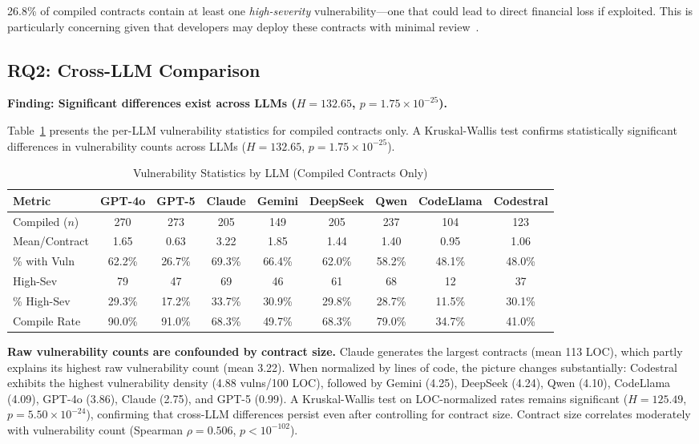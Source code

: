 26.8\% of compiled contracts contain at least one \emph{high-severity} vulnerability---one that could lead to direct financial loss if exploited. This is particularly concerning given that developers may deploy these contracts with minimal review~\cite{perry2023users}.

\subsection{RQ2: Cross-LLM Comparison}

\textbf{Finding: Significant differences exist across LLMs ($H = 132.65$, $p = 1.75 \times 10^{-25}$).}

Table~\ref{tab:llm_comparison} presents the per-LLM vulnerability statistics for compiled contracts only. A Kruskal-Wallis test confirms statistically significant differences in vulnerability counts across LLMs ($H = 132.65$, $p = 1.75 \times 10^{-25}$).

\begin{table}[t]
\caption{Vulnerability Statistics by LLM (Compiled Contracts Only)}
\label{tab:llm_comparison}
\centering
\footnotesize
\begin{tabular}{@{}lcccccccc@{}}
\toprule
\textbf{Metric} & \textbf{GPT-4o} & \textbf{GPT-5} & \textbf{Claude} & \textbf{Gemini} & \textbf{DeepSeek} & \textbf{Qwen} & \textbf{CodeLlama} & \textbf{Codestral} \\
\midrule
Compiled ($n$) & 270 & 273 & 205 & 149 & 205 & 237 & 104 & 123 \\
Mean/Contract & 1.65 & 0.63 & 3.22 & 1.85 & 1.44 & 1.40 & 0.95 & 1.06 \\
\% with Vuln & 62.2\% & 26.7\% & 69.3\% & 66.4\% & 62.0\% & 58.2\% & 48.1\% & 48.0\% \\
High-Sev & 79 & 47 & 69 & 46 & 61 & 68 & 12 & 37 \\
\% High-Sev & 29.3\% & 17.2\% & 33.7\% & 30.9\% & 29.8\% & 28.7\% & 11.5\% & 30.1\% \\
Compile Rate & 90.0\% & 91.0\% & 68.3\% & 49.7\% & 68.3\% & 79.0\% & 34.7\% & 41.0\% \\
\bottomrule
\end{tabular}
\end{table}

\textbf{Raw vulnerability counts are confounded by contract size.} Claude generates the largest contracts (mean 113 LOC), which partly explains its highest raw vulnerability count (mean 3.22). When normalized by lines of code, the picture changes substantially: Codestral exhibits the highest vulnerability density (4.88 vulns/100 LOC), followed by Gemini (4.25), DeepSeek (4.24), Qwen (4.10), CodeLlama (4.09), GPT-4o (3.86), Claude (2.75), and GPT-5 (0.99). A Kruskal-Wallis test on LOC-normalized rates remains significant ($H = 125.49$, $p = 5.50 \times 10^{-24}$), confirming that cross-LLM differences persist even after controlling for contract size. Contract size correlates moderately with vulnerability count (Spearman $\rho = 0.506$, $p < 10^{-102}$).

